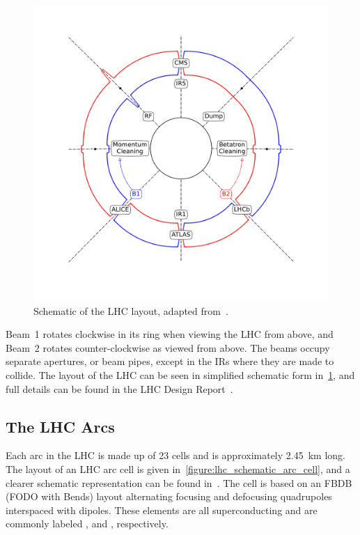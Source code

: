\begin{figure}[!htb]
  \centering
  \includegraphics*[width=0.81\linewidth]{Figures/Optics_Measurements_Corrections_at_LHC/lhc_schematic.pdf}
  \caption{Schematic of the LHC layout, adapted from~\cite{PHD:Poyet}.}
  \label{figure:lhc_schematic_layout}
\end{figure}

Beam~\num{1} rotates clockwise in its ring when viewing the \gls{LHC} from above, and Beam~\num{2} rotates counter-clockwise as viewed from above.
The beams occupy separate apertures, or beam pipes, except in the \glspl{IR} where they are made to collide.
The layout of the \gls{LHC} can be seen in simplified schematic form in~\cref{figure:lhc_schematic_layout}, and full details can be found in the \gls{LHC} Design Report~\cite{BOOK:Bruning:LHC_Design_Report_Main_Ring,BOOK:Bruning:LHC_Design_Report_Infrastructure,BOOK:Benedikt:LHC_Design_Report_Injector_Chain}.

\subsection{The LHC Arcs}
\label{subsection:lhc_arcs}

Each arc in the \gls{LHC} is made up of 23 cells and is approximately \qty{2.45}{\kilo\meter} long.
The layout of an \gls{LHC} arc cell is given in~\cref{figure:lhc_schematic_arc_cell}, and a clearer schematic representation can be found in~\cite{MASTERS:Keintzel:Arc_Cell_Options_HELHC}.
The cell is based on an FBDB (FODO with Bends) layout alternating focusing and defocusing quadrupoles interspaced with dipoles.
These elements are all superconducting and are commonly labeled ,  and , respectively.

